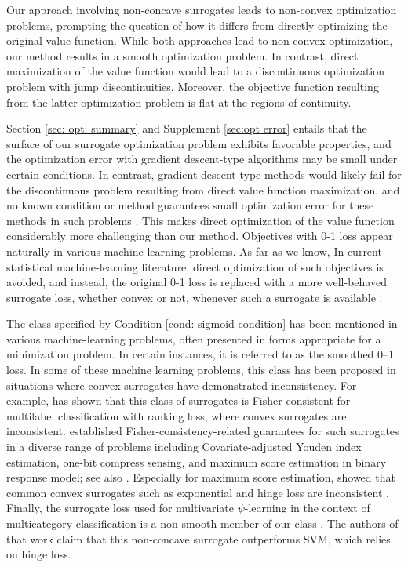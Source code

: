 \documentclass[preprint] {imsart}
\begin{document}
{\color{black}
\label{page: diff from zo} Our approach involving non-concave surrogates leads to non-convex optimization problems, prompting the question of how it differs from directly optimizing the original value function. While both approaches lead to non-convex optimization, our method results in a smooth optimization problem. In contrast, direct maximization of the value function would lead to a discontinuous optimization problem with jump discontinuities. Moreover, the objective function resulting from the latter optimization problem is flat at the regions of continuity. 

Section \ref{sec: opt: summary} and Supplement \ref{sec:opt error} entails that the surface of our surrogate optimization problem exhibits favorable properties, and the optimization error with gradient descent-type algorithms may be small under certain  conditions. In contrast, gradient descent-type methods would likely fail for the discontinuous  problem resulting from direct value function maximization, and no known condition or method guarantees small optimization error for these methods in such problems \citep{xu2014model}.  This makes direct optimization of the value function considerably more challenging than our method. Objectives with 0-1 loss appear naturally in various machine-learning problems. As far as we know, In current statistical machine-learning literature, direct optimization of such objectives is avoided, and instead, the original 0-1 loss is replaced with a more well-behaved surrogate loss, whether convex or not, whenever such a surrogate is available  \citep{mukherjee2021optimal,xu2014model,horowitz1992smoothed,feng2022nonregular,pedregosa2017,gao2011,calauzenes2012}.

The class specified by\label{page: examples} Condition \ref{cond: sigmoid condition} has been mentioned in various machine-learning problems, often presented in forms appropriate for a minimization problem. In certain instances, it is referred to as the smoothed 0--1 loss. In some of these machine learning  problems, this class has been proposed in situations where convex surrogates have demonstrated inconsistency.   For example, \cite{gao2011} has shown that this class of surrogates is Fisher consistent for multilabel classification with ranking loss, where convex surrogates are inconsistent. \cite{feng2022nonregular} established Fisher-consistency-related guarantees for such surrogates  in a diverse range of problems including  Covariate-adjusted Youden index estimation, one-bit compress sensing, and maximum score estimation in  binary response model; see also \cite{xu2014model,mukherjee2021optimal}. Especially for maximum score estimation, \cite{feng2022nonregular}  showed that common convex surrogates such as exponential and hinge loss are inconsistent \citep{feng2022nonregular}.  Finally, the surrogate loss used for multivariate $\psi$-learning in the context of multicategory classification is a non-smooth member of our class \citep{liu2006multicategory}. The authors of that work claim that this non-concave surrogate outperforms SVM, which relies on hinge loss. }
\end{document}
